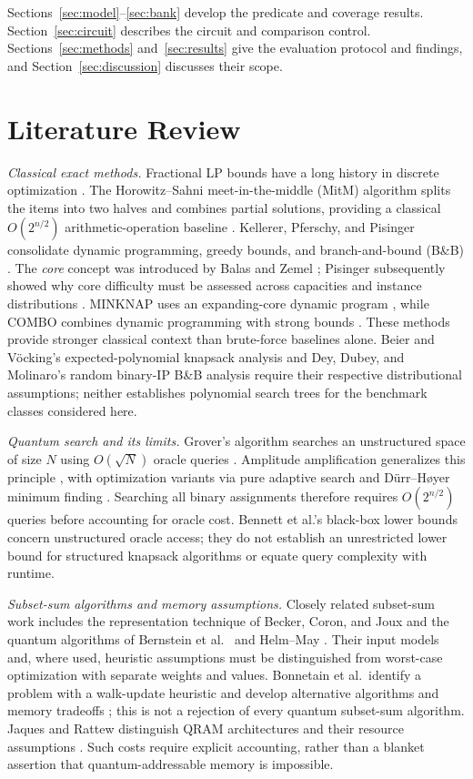 \documentclass[referee,pdflatex,sn-mathphys-num]{sn-jnl}
\theoremstyle{thmstyleone}
\theoremstyle{thmstyletwo}
\begin{document}
Sections~\ref{sec:model}--\ref{sec:bank} develop the predicate and coverage results. Section~\ref{sec:circuit} describes the circuit and comparison control. Sections~\ref{sec:methods} and~\ref{sec:results} give the evaluation protocol and findings, and Section~\ref{sec:discussion} discusses their scope.

\section{Literature Review}

\textit{Classical exact methods.} Fractional LP bounds have a long history in discrete optimization \cite{ref1}. The Horowitz--Sahni meet-in-the-middle (MitM) algorithm splits the items into two halves and combines partial solutions, providing a classical $O(2^{n/2})$ arithmetic-operation baseline \cite{ref2}. Kellerer, Pferschy, and Pisinger consolidate dynamic programming, greedy bounds, and branch-and-bound (B\&B) \cite{ref3}. The \emph{core} concept was introduced by Balas and Zemel \cite{balas1980core}; Pisinger subsequently showed why core difficulty must be assessed across capacities and instance distributions \cite{ref4}. MINKNAP uses an expanding-core dynamic program \cite{pisinger1997minimal}, while COMBO combines dynamic programming with strong bounds \cite{martello1999combo}. These methods provide stronger classical context than brute-force baselines alone. Beier and V\"ocking's expected-polynomial knapsack analysis \cite{beier2004random} and Dey, Dubey, and Molinaro's random binary-IP B\&B analysis \cite{dey2021random} require their respective distributional assumptions; neither establishes polynomial search trees for the benchmark classes considered here.

\textit{Quantum search and its limits.} Grover's algorithm searches an unstructured space of size $N$ using $O(\sqrt{N})$ oracle queries \cite{ref8}. Amplitude amplification generalizes this principle \cite{ref11}, with optimization variants via pure adaptive search \cite{ref12} and D\"urr--H{\o}yer minimum finding \cite{ref13}. Searching all binary assignments therefore requires $O(2^{n/2})$ queries before accounting for oracle cost. Bennett et al.'s black-box lower bounds \cite{ref9} concern unstructured oracle access; they do not establish an unrestricted lower bound for structured knapsack algorithms or equate query complexity with runtime.

\textit{Subset-sum algorithms and memory assumptions.} Closely related subset-sum work includes the representation technique of Becker, Coron, and Joux \cite{ref5} and the quantum algorithms of Bernstein et al.\ \cite{ref16} and Helm--May \cite{ref17}. Their input models and, where used, heuristic assumptions must be distinguished from worst-case optimization with separate weights and values. Bonnetain et al.\ identify a problem with a walk-update heuristic and develop alternative algorithms and memory tradeoffs \cite{bonnetain2020improved}; this is not a rejection of every quantum subset-sum algorithm. Jaques and Rattew distinguish QRAM architectures and their resource assumptions \cite{ref18}. Such costs require explicit accounting, rather than a blanket assertion that quantum-addressable memory is impossible.
\end{document}
